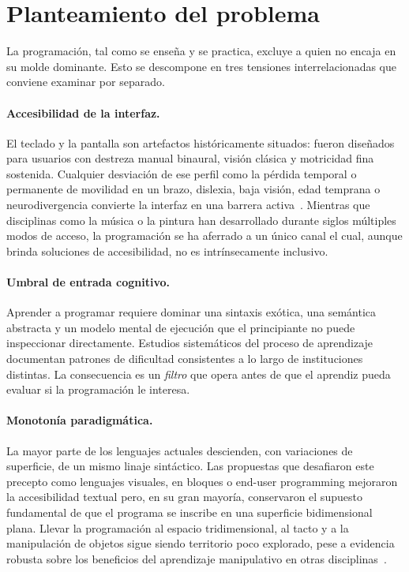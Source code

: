 
\section{Planteamiento del problema}
\label{sec:problem}

La programaci\'on, tal como se ense\~na y se practica, excluye a quien no
encaja en su molde dominante. Esto se descompone en tres tensiones
interrelacionadas que conviene examinar por separado.

\paragraph{Accesibilidad de la interfaz.}
El teclado y la pantalla son artefactos hist\'oricamente situados: fueron
dise\~nados para usuarios con destreza manual binaural, visi\'on cl\'asica
y motricidad fina sostenida. Cualquier desviaci\'on de ese perfil
como la p\'erdida temporal o permanente de movilidad en un brazo, dislexia, baja visi\'on,
edad temprana o neurodivergencia convierte la interfaz en una barrera
activa~\cite{ko23,oleson23inclusive}. Mientras que disciplinas como
la m\'usica o la pintura han desarrollado durante siglos m\'ultiples
modos de acceso, la programaci\'on se ha aferrado a un \'unico canal el cual,
aunque brinda soluciones de accesibilidad, no es intr\'insecamente inclusivo.

\paragraph{Umbral de entrada cognitivo.}
Aprender a programar requiere dominar una sintaxis
ex\'otica, una sem\'antica abstracta y un modelo mental de ejecuci\'on
que el principiante no puede inspeccionar directamente. Estudios
sistem\'aticos del proceso de aprendizaje~\cite{bosse17gerosa,robins03learning}
documentan patrones de dificultad consistentes a lo largo de instituciones distintas. 
La consecuencia es un \emph{filtro} que opera antes de que el aprendiz pueda evaluar 
si la programaci\'on le interesa.

\paragraph{Monoton\'ia paradigm\'atica.}
La mayor parte de los lenguajes actuales descienden, con variaciones de
superficie, de un mismo linaje sint\'actico. Las propuestas que
desafiaron este precepto como lenguajes visuales, en bloques o end-user
programming mejoraron la accesibilidad textual pero, en
su gran mayor\'ia, conservaron el supuesto fundamental de que el
programa se inscribe en una superficie bidimensional plana. Llevar la
programaci\'on al espacio tridimensional, al tacto y a la manipulaci\'on
de objetos sigue siendo territorio poco explorado, pese a evidencia
robusta sobre los beneficios del aprendizaje manipulativo en otras
disciplinas~\cite{montessori12mind,marshall07tangible}.

